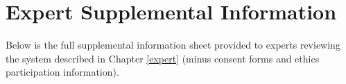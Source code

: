 \chapter{Expert Supplemental Information}
\label{appendix:expert}

Below is the full supplemental information sheet provided to experts reviewing the system described in Chapter \ref{expert} (minus consent forms and ethics participation information).